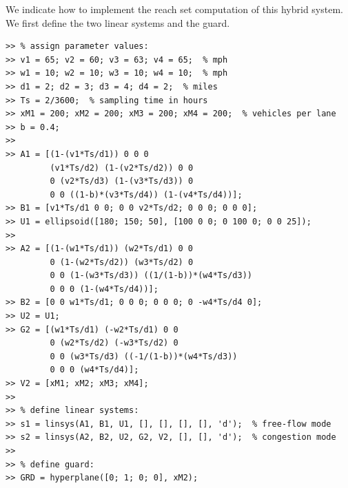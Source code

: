 \documentclass{report}
\begin{document}
We indicate how to implement the reach set computation of this hybrid system.
We first define the two linear systems and the guard.
{\tt \begin{verbatim}
>> % assign parameter values:
>> v1 = 65; v2 = 60; v3 = 63; v4 = 65;  % mph
>> w1 = 10; w2 = 10; w3 = 10; w4 = 10;  % mph
>> d1 = 2; d2 = 3; d3 = 4; d4 = 2;  % miles
>> Ts = 2/3600;  % sampling time in hours
>> xM1 = 200; xM2 = 200; xM3 = 200; xM4 = 200;  % vehicles per lane
>> b = 0.4;
>>
>> A1 = [(1-(v1*Ts/d1)) 0 0 0
         (v1*Ts/d2) (1-(v2*Ts/d2)) 0 0
         0 (v2*Ts/d3) (1-(v3*Ts/d3)) 0
         0 0 ((1-b)*(v3*Ts/d4)) (1-(v4*Ts/d4))];
>> B1 = [v1*Ts/d1 0 0; 0 0 v2*Ts/d2; 0 0 0; 0 0 0];
>> U1 = ellipsoid([180; 150; 50], [100 0 0; 0 100 0; 0 0 25]);
>>
>> A2 = [(1-(w1*Ts/d1)) (w2*Ts/d1) 0 0
         0 (1-(w2*Ts/d2)) (w3*Ts/d2) 0
         0 0 (1-(w3*Ts/d3)) ((1/(1-b))*(w4*Ts/d3))
         0 0 0 (1-(w4*Ts/d4))];
>> B2 = [0 0 w1*Ts/d1; 0 0 0; 0 0 0; 0 -w4*Ts/d4 0];
>> U2 = U1;
>> G2 = [(w1*Ts/d1) (-w2*Ts/d1) 0 0
         0 (w2*Ts/d2) (-w3*Ts/d2) 0
         0 0 (w3*Ts/d3) ((-1/(1-b))*(w4*Ts/d3))
         0 0 0 (w4*Ts/d4)];
>> V2 = [xM1; xM2; xM3; xM4];
>>
>> % define linear systems:
>> s1 = linsys(A1, B1, U1, [], [], [], [], 'd');  % free-flow mode
>> s2 = linsys(A2, B2, U2, G2, V2, [], [], 'd');  % congestion mode
>>
>> % define guard:
>> GRD = hyperplane([0; 1; 0; 0], xM2);
\end{verbatim}}
\end{document}
